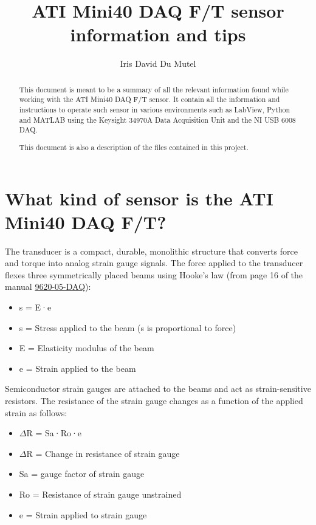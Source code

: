 \documentclass[a4paper]{article}
\title{ATI Mini40 DAQ F/T sensor information and tips}
\author{Iris David Du Mutel}
\begin{document}
	
\maketitle
\tableofcontents
\begin{abstract}
	This document is meant to be a summary of all the relevant information found while working with the ATI Mini40 DAQ F/T sensor. It contain all the information and instructions to operate such sensor in various environments such as LabView, Python and MATLAB using the Keysight 34970A Data Acquisition Unit and the  NI USB 6008 DAQ. 
	
	This document is also a description of the files contained in this project.
\end{abstract}


\section{What kind of sensor is the ATI Mini40 DAQ F/T?}

The transducer is a compact, durable, monolithic structure that converts force and torque into analog strain
gauge signals. 
The force applied to the transducer flexes three symmetrically placed beams using Hooke’s law (from page 16 of the manual \hyperref{https://www.ati-ia.com/app_content/documents/9620-05-DAQ.pdf}{category}{name}{9620-05-DAQ}):
\begin{itemize}
	\item s = E·e
	\item s = Stress applied to the beam (s is proportional to force)
	\item E = Elasticity modulus of the beam
	\item e = Strain applied to the beam
\end{itemize}

Semiconductor strain gauges are attached to the beams and act as strain-sensitive resistors. The resistance of
the strain gauge changes as a function of the applied strain as follows:

\begin{itemize}
	\item $\Delta$R = Sa·Ro·e
	\item $\Delta$R = Change in resistance of strain gauge
	\item Sa = gauge factor of strain gauge
	\item Ro = Resistance of strain gauge unstrained
	\item e = Strain applied to strain gauge
\end{itemize}
\end{document}
